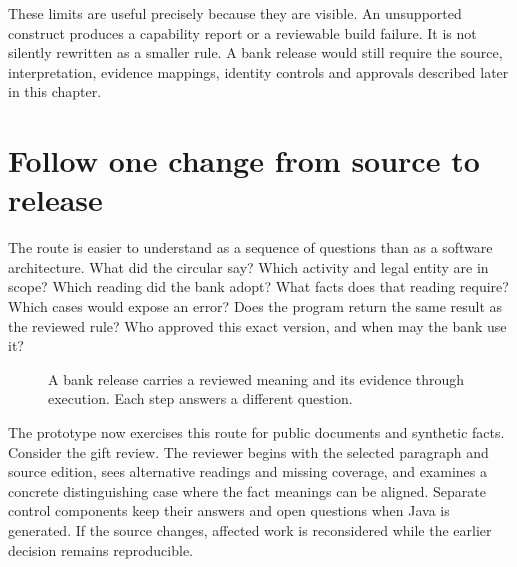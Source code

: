 \documentclass[12pt,a4paper,oneside,openany]{book}
\begin{document}
These limits are useful precisely because they are visible. An unsupported
construct produces a capability report or a reviewable build failure. It is not
silently rewritten as a smaller rule. A bank release would still require the
source, interpretation, evidence mappings, identity controls and approvals
described later in this chapter.

\section{Follow one change from source to release}

The route is easier to understand as a sequence of questions than as a software
architecture. What did the circular say? Which activity and legal entity are in
scope? Which reading did the bank adopt? What facts does that reading require?
Which cases would expose an error? Does the program return the same result as the
reviewed rule? Who approved this exact version, and when may the bank use it?

\begin{figure}[htbp]
\centering
{}
\caption{A bank release carries a reviewed meaning and its evidence through
execution. Each step answers a different question.}
\label{fig:reader-implementation-route}
\end{figure}

The prototype now exercises this route for public documents and synthetic facts.
Consider the gift review. The reviewer begins with the selected paragraph and
source edition, sees alternative readings and missing coverage, and examines a
concrete distinguishing case where the fact meanings can be aligned. Separate
control components keep their answers and open questions when Java is generated.
If the source changes, affected work is reconsidered while the earlier decision
remains reproducible.
\end{document}
